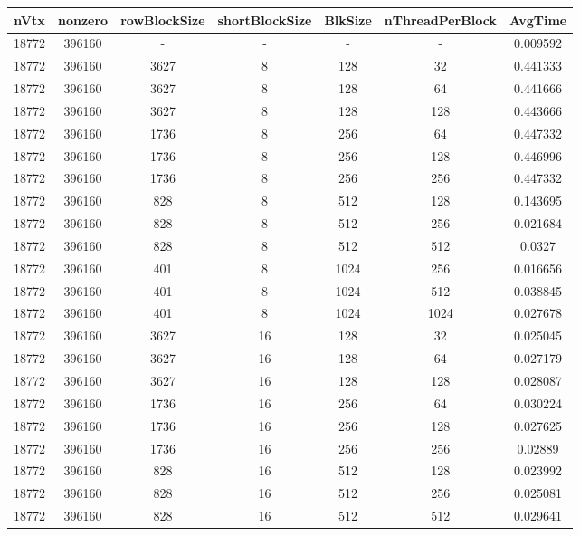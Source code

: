 \documentclass[9pt]{article}
\begin{document}
\SetBgPosition{0.25cm,-5.0cm}
\begin{tabular}{|c|c|c|c|c|c|c| }  
\hline
nVtx  & nonzero  & rowBlockSize  & shortBlockSize  & BlkSize  & nThreadPerBlock  & AvgTime \\
\hline
18772  & 396160  &  -  & -  & -  & -  &0.009592 \\
\hline
18772  & 396160  & 3627  & 8  & 128  & 32  & 0.441333 \\
\hline
18772  & 396160  & 3627  & 8  & 128  & 64  & 0.441666 \\
\hline
18772  & 396160  & 3627  & 8  & 128  & 128  & 0.443666 \\
\hline
18772  & 396160  & 1736  & 8  & 256  & 64  & 0.447332 \\
\hline
18772  & 396160  & 1736  & 8  & 256  & 128  & 0.446996 \\
\hline
18772  & 396160  & 1736  & 8  & 256  & 256  & 0.447332 \\
\hline
18772  & 396160  & 828  & 8  & 512  & 128  & 0.143695 \\
\hline
18772  & 396160  & 828  & 8  & 512  & 256  & 0.021684 \\
\hline
18772  & 396160  & 828  & 8  & 512  & 512  & 0.0327 \\
\hline
18772  & 396160  & 401  & 8  & 1024  & 256  & 0.016656 \\
\hline
18772  & 396160  & 401  & 8  & 1024  & 512  & 0.038845 \\
\hline
18772  & 396160  & 401  & 8  & 1024  & 1024  & 0.027678 \\
\hline
18772  & 396160  & 3627  & 16  & 128  & 32  & 0.025045 \\
\hline
18772  & 396160  & 3627  & 16  & 128  & 64  & 0.027179 \\
\hline
18772  & 396160  & 3627  & 16  & 128  & 128  & 0.028087 \\
\hline
18772  & 396160  & 1736  & 16  & 256  & 64  & 0.030224 \\
\hline
18772  & 396160  & 1736  & 16  & 256  & 128  & 0.027625 \\
\hline
18772  & 396160  & 1736  & 16  & 256  & 256  & 0.02889 \\
\hline
18772  & 396160  & 828  & 16  & 512  & 128  & 0.023992 \\
\hline
18772  & 396160  & 828  & 16  & 512  & 256  & 0.025081 \\
\hline
18772  & 396160  & 828  & 16  & 512  & 512  & 0.029641 \\

\end{tabular}
\end{document}
